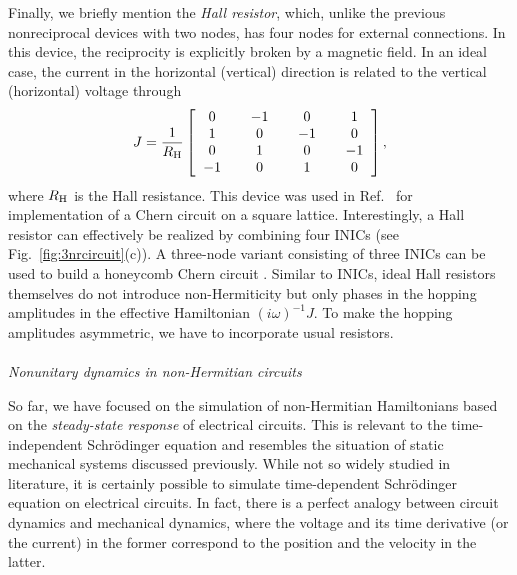 \documentclass{tADP2e}
\theoremstyle{plain}
\theoremstyle{plain}
\theoremstyle{definition}
\begin{document}
Finally, we briefly mention the \emph{Hall resistor}, which, unlike the previous nonreciprocal devices with two nodes, has four nodes for external connections. In this device, the reciprocity is explicitly broken by a magnetic field. In an ideal case, the current in the horizontal (vertical) direction is related to the vertical (horizontal) voltage through \cite{HR19}
\begin{equation}
J=\frac{1}{R_{\rm H}}
\begin{bmatrix} 
\;\;0\;\; & \;\;-1\;\; & \;\;0\;\; & \;\;1\;\; \\ 
\;\;1\;\; & \;\;0\;\; & \;\;-1\;\; & \;\;0\;\;  \\  
\;\;0\;\; & \;\;1\;\; & \;\;0\;\; & \;\;-1\;\; \\
\;\;-1\;\; & \;\;0\;\; & \;\;1\;\; & \;\;0\;\;  
\end{bmatrix},
\end{equation}
where $R_{\rm H}$ is the Hall resistance. This device was used in Ref.~\cite{HR19} for implementation of a Chern circuit on a square lattice. Interestingly, a Hall resistor can effectively be realized by combining four INICs (see Fig.~\ref{fig:3nrcircuit}(c)). A three-node variant consisting of three INICs can be used to build a honeycomb Chern circuit \cite{HR19}. Similar to INICs, ideal Hall resistors themselves do not introduce non-Hermiticity but only phases in the hopping amplitudes in the effective Hamiltonian $(i\omega)^{-1}J$. To make the hopping amplitudes asymmetric, we have to incorporate usual resistors. 
\\ \\ {\it Nonunitary dynamics in non-Hermitian circuits}

\vspace{3pt}
\noindent
So far, we have focused on the simulation of non-Hermitian Hamiltonians based on the \emph{steady-state response} of electrical circuits. This is relevant to the time-independent Schr\"odinger equation and resembles the situation of static mechanical systems discussed previously. While not so widely studied in literature, it is certainly possible to simulate time-dependent Schr\"odinger equation on electrical circuits. In fact, there is a perfect analogy between circuit dynamics and mechanical dynamics, where the voltage and its time derivative (or the current) in the former correspond to the position and the velocity in the latter. 
\end{document}
